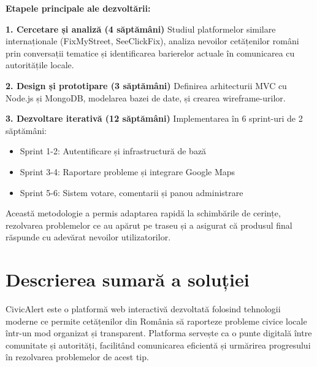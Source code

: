 \documentclass[12pt,a4paper]{report}
\begin{document}
\textbf{Etapele principale ale dezvoltării:}

\textbf{1. Cercetare și analiză (4 săptămâni)}
Studiul platformelor similare internaționale (FixMyStreet, SeeClickFix), analiza nevoilor cetățenilor români prin conversații tematice și identificarea barierelor actuale în comunicarea cu autoritățile locale.

\textbf{2. Design și prototipare (3 săptămâni)}
Definirea arhitecturii MVC cu Node.js și MongoDB, modelarea bazei de date, și crearea wireframe-urilor.

\textbf{3. Dezvoltare iterativă (12 săptămâni)}
Implementarea în 6 sprint-uri de 2 săptămâni:
\begin{itemize}
\item Sprint 1-2: Autentificare și infrastructură de bază
\item Sprint 3-4: Raportare probleme și integrare Google Maps
\item Sprint 5-6: Sistem votare, comentarii și panou administrare
\end{itemize}



Această metodologie a permis adaptarea rapidă la schimbările de cerințe, rezolvarea problemelor ce au apărut pe traseu și a asigurat că produsul final răspunde cu adevărat nevoilor utilizatorilor.

\section*{Descrierea sumară a soluției}

CivicAlert este o platformă web interactivă dezvoltată folosind tehnologii moderne  ce permite cetățenilor din România să raporteze probleme civice locale într-un mod organizat și transparent. Platforma servește ca o punte digitală între comunitate și autorități, facilitând comunicarea eficientă și urmărirea progresului în rezolvarea problemelor de acest tip.
\end{document}
